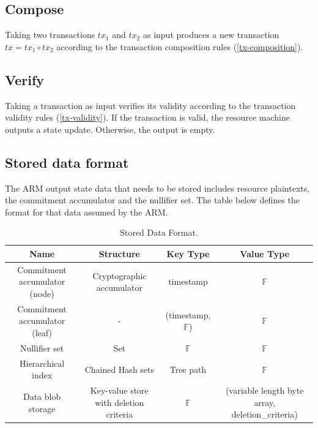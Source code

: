 \documentclass[
    11pt,            %
    techreport,        %
    affiltop,       %
]{art}
\begin{document}
\subsection{Compose}

Taking two transactions $tx_1$ and $tx_2$ as input produces a new transaction $tx = tx_1 \circ tx_2$ according to the transaction composition rules (\ref{tx-composition}).

\subsection{Verify}

Taking a transaction as input verifies its validity according to the transaction validity rules (\ref{tx-validity}). If the transaction is valid, the resource machine outputs a state update. Otherwise, the output is empty.

\subsection{Stored data format}\label{storage}

The ARM output state data that needs to be stored includes resource plaintexts, the commitment accumulator and the nullifier set. The table below defines the format for that data assumed by the ARM.

\begin{table}[!h]
\begin{center}
\begin{tabular}{|c|c|c|c|}
\hline
 \textbf{Name} & \textbf{Structure} & \textbf{Key Type} & \textbf{Value Type} \\ \hline
 Commitment accumulator (node) & Cryptographic accumulator & timestamp & $\mathbb{F}$ \\ \hline
  Commitment accumulator (leaf) & - & (timestamp, $\mathbb{F}$) & $\mathbb{F}$ \\ \hline
 Nullifier set & Set & $\mathbb{F}$ & $\mathbb{F}$ \\ \hline
 Hierarchical index & Chained Hash sets & Tree path & $\mathbb{F}$ \\ \hline
 Data blob storage & Key-value store with deletion criteria & $\mathbb{F}$ & (variable length byte array, deletion\_criteria) \\ \hline
\end{tabular}
\caption{Stored Data Format.}
\end{center}
\end{table}
\end{document}
